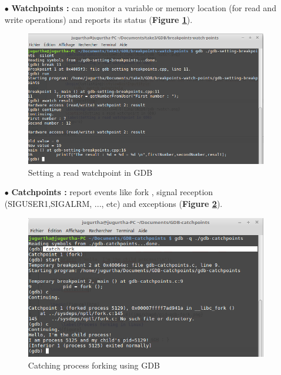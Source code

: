 \begin{itemize}
\begin{itemize}
\item[$\bullet$] \textbf{Watchpoints : } can monitor a variable or memory location (for read and write operations) and reports its status (\textbf{Figure \ref{Setting a read watchpoint in GDB}}).
\begin{figure}[H]
		\centering
        \includegraphics[scale=0.32]{img/solution/gdb-awatch.png}
        \caption{Setting a read watchpoint in GDB}
        \label{Setting a read watchpoint in GDB}
    \end{figure}
    
    
\item[$\bullet$] \textbf{Catchpoints : } report events like fork , signal reception (SIGUSER1,SIGALRM, ..., etc) and exceptions (\textbf{Figure \ref{Catching process forking using GDB}}).
\begin{figure}[H]
		\centering
        \includegraphics[scale=0.32]{img/solution/gdb-fork-got-catch.png}
        \caption{Catching process forking using GDB}
        \label{Catching process forking using GDB}
    \end{figure}
    



\end{itemize}
\end{itemize}
